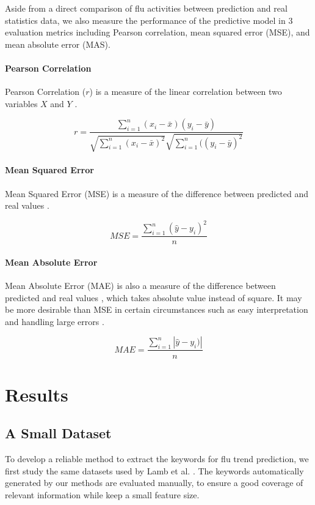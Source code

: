 \documentclass[12pt, oneside]{article}
\begin{document}
Aside from a direct comparison of flu activities between prediction and real statistics data,
we also measure the performance of the predictive model in 3 evaluation metrics including
Pearson correlation, mean squared error (MSE), and mean absolute error (MAS).

\paragraph{Pearson Correlation}
Pearson Correlation ($r$) is a measure of the linear correlation between two variables $X$ and $Y$ \cite{wiki:correlation}.

$$ r = \frac{\sum_{i=1}^n(x_i-\bar{x})(y_i-\bar{y})}{\sqrt{\sum_{i=1}^n(x_i-\bar{x})^2}\sqrt{\sum_{i=1}^n((y_i-\bar{y})^2}}$$

\paragraph{Mean Squared Error}
Mean Squared Error (MSE) is a measure of the difference between predicted and real values \cite{wiki:root-mean-square}.

$$MSE = \frac{\sum_{i=1}^{n}(\hat{y}-y_i)^2}{n}$$

\paragraph{Mean Absolute Error}
Mean Absolute Error (MAE) is also a measure of the difference between predicted and real values \cite{wiki:mean-absolute-error}, which takes absolute value instead of square.
It may be more desirable than MSE in certain circumstances such as easy interpretation and handling large errors \cite{wiki:mean-absolute-error-root-mean-square}.

$$MAE = \frac{\sum_{i=1}^{n}|\hat{y}-y_i)|}{n}$$

\section{Results}


\subsection{A Small Dataset}
To develop a reliable method to extract the keywords for flu trend prediction, we first study the same datasets
used by Lamb et al. \cite{lamb-paul-dredze-naacl-2013}. The keywords automatically generated by our methods are evaluated manually,
to ensure a good coverage of relevant information while keep a small feature size.
\end{document}

